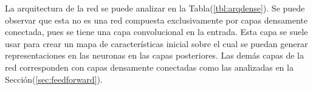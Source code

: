         La arquitectura de la red se puede analizar en la Tabla(\ref{tbl:arqdense}). Se puede observar que esta no es una red 
        compuesta exclusivamente por capas densamente conectada, pues se tiene una capa convolucional en la entrada. Esta 
        capa se suele usar para crear un mapa de características inicial sobre el cual se puedan generar representaciones 
        en las neuronas en las capas posteriores. Las demás capas de la red corresponden con capas densamente conectadas 
        como las analizadas en la Sección(\ref{sec:feedforward}). 

        \begin{table}[]
            \centering
\end{table}
